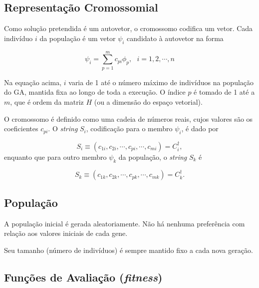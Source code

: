 	\subsection{Representação Cromossomial}
	
	Como solução pretendida é um autovetor, o cromossomo codifica um vetor. Cada indivíduo $i$ da população é um vetor $\psi_i$ candidato à autovetor na forma
	
	\begin{equation}
		\psi_i = \sum_{p=1}^m c_{pi}\phi_p, \mbox{   } i = 1,2, \cdots, n
	\end{equation}
	
	Na equação acima, $i$ varia de 1 até o número máximo de indivíduos na população do GA, mantida fixa ao longo de toda a execução. O índice $p$ é tomado de 1 até a $m$, que é ordem da matriz $H$ (ou a dimensão do espaço vetorial).
	
	O cromossomo é definido como uma cadeia de números reais, cujos valores são os coeficientes $c_{pi}$. O \emph{string} $S_i$, codificação para o membro $\psi_i$, é dado por
	
	\begin{equation}
		S_i \equiv  (c_{1i}, c_{2i}, \cdots, c_{pi}, \cdots, c_{mi}) = C^{\dagger}_i,
	\end{equation}
	enquanto que para outro membro $\psi_k$ da população, o \emph{string} $S_k$ é
	
	\begin{equation}
		S_k \equiv  (c_{1k}, c_{2k}, \cdots, c_{pk}, \cdots, c_{mk}) = C^{\dagger}_k.
	\end{equation}
	
	\subsection{População}

	A população inicial é gerada aleatoriamente. Não há nenhuma preferência com relação aos valores iniciais de cada gene.
	
	Seu tamanho (número de indivíduos) é sempre mantido fixo a cada nova geração.
	
	\subsection{Funções de Avaliação (\emph{fitness})}

